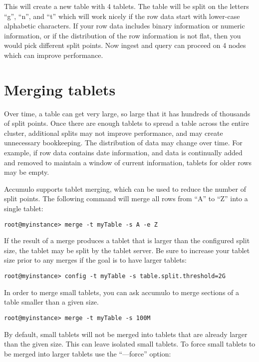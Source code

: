 This will create a new table with 4 tablets.  The table will be split
on the letters ``g'', ``n'', and ``t'' which will work nicely if the
row data start with lower-case alphabetic characters.  If your row
data includes binary information or numeric information, or if the
distribution of the row information is not flat, then you would pick
different split points.  Now ingest and query can proceed on 4 nodes
which can improve performance.

\section{Merging tablets}

Over time, a table can get very large, so large that it has hundreds
of thousands of split points.  Once there are enough tablets to spread
a table across the entire cluster, additional splits may not improve
performance, and may create unnecessary bookkeeping.  The distribution
of data may change over time.  For example, if row data contains date
information, and data is continually added and removed to maintain a
window of current information, tablets for older rows may be empty.

Accumulo supports tablet merging, which can be used to reduce 
the number of split points.  The following command will merge all rows
from ``A'' to ``Z'' into a single tablet:

\small
\begin{verbatim}
root@myinstance> merge -t myTable -s A -e Z
\end{verbatim}
\normalsize

If the result of a merge produces a tablet that is larger than the
configured split size, the tablet may be split by the tablet server.
Be sure to increase your tablet size prior to any merges if the goal
is to have larger tablets:

\small
\begin{verbatim}
root@myinstance> config -t myTable -s table.split.threshold=2G
\end{verbatim}
\normalsize

In order to merge small tablets, you can ask accumulo to merge
sections of a table smaller than a given size.

\small
\begin{verbatim}
root@myinstance> merge -t myTable -s 100M
\end{verbatim}
\normalsize

By default, small tablets will not be merged into tablets that are
already larger than the given size.  This can leave isolated small
tablets.  To force small tablets to be merged into larger tablets use
the ``--{}--force'' option:

